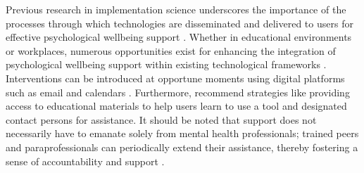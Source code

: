 Previous research in implementation science underscores the importance of the processes through which technologies are disseminated and delivered to users for effective psychological wellbeing support \cite{graham2020implementation, hermes2019measuring, powell2012compilation, powell2015refined}. Whether in educational environments or workplaces, numerous opportunities exist for enhancing the integration of psychological wellbeing support within existing technological frameworks \cite{graham2020implementation, haldar2022collaboration, xu2023technology}. Interventions can be introduced at opportune moments using digital platforms such as email and calendars \cite{howe2022design}. %
Furthermore, \citet{graham2020implementation} recommend strategies like providing access to educational materials to help users learn to use a tool and designated contact persons for assistance. It should be noted that support does not necessarily have to emanate solely from mental health professionals; trained peers and paraprofessionals can periodically extend their assistance, thereby fostering a sense of accountability and support \cite{sultana2019parar, anvari2022behavioral, okolo2021cannot, burgess2019think, jardine2023between, haldar2022collaboration}.






